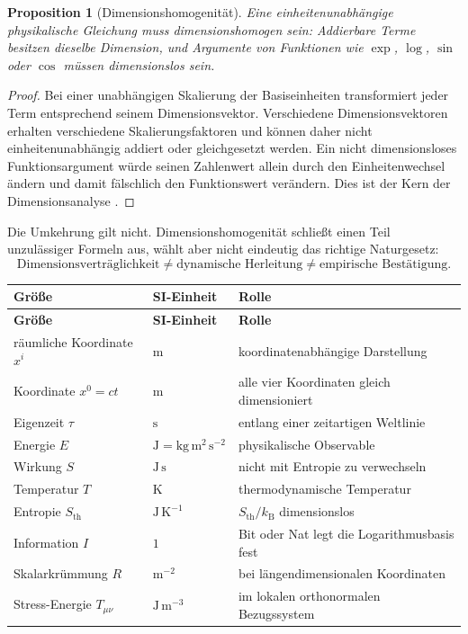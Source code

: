 \documentclass[11pt,a4paper]{article}
\newtheorem{proposition}{Proposition}[section]
\theoremstyle{remark}
\begin{document}
\begin{proposition}[Dimensionshomogenität]
Eine einheitenunabhängige physikalische Gleichung muss dimensionshomogen
sein: Addierbare Terme besitzen dieselbe Dimension, und Argumente von
Funktionen wie \(\exp\), \(\log\), \(\sin\) oder \(\cos\) müssen
dimensionslos sein.
\end{proposition}

\begin{proof}
Bei einer unabhängigen Skalierung der Basiseinheiten transformiert jeder Term
entsprechend seinem Dimensionsvektor. Verschiedene Dimensionsvektoren erhalten
verschiedene Skalierungsfaktoren und können daher nicht einheitenunabhängig
addiert oder gleichgesetzt werden. Ein nicht dimensionsloses
Funktionsargument würde seinen Zahlenwert allein durch den Einheitenwechsel
ändern und damit fälschlich den Funktionswert verändern. Dies ist der Kern der
Dimensionsanalyse \citep{buckingham1914}.
\end{proof}

Die Umkehrung gilt nicht. Dimensionshomogenität schließt einen Teil
unzulässiger Formeln aus, wählt aber nicht eindeutig das richtige Naturgesetz:
\[
  \boxed{
  \text{Dimensionsverträglichkeit}
  \neq\text{dynamische Herleitung}
  \neq\text{empirische Bestätigung}.}
\]

\begin{longtable}{>{\raggedright\arraybackslash}p{}
                  >{\raggedright\arraybackslash}p{}
                  >{\raggedright\arraybackslash}p{}}
\toprule
\textbf{Größe} & \textbf{SI-Einheit} & \textbf{Rolle} \\
\midrule
\endfirsthead
\toprule
\textbf{Größe} & \textbf{SI-Einheit} & \textbf{Rolle} \\
\midrule
\endhead
räumliche Koordinate \(x^i\) & \(\mathrm m\) & koordinatenabhängige Darstellung \\
Koordinate \(x^0=ct\) & \(\mathrm m\) & alle vier Koordinaten gleich dimensioniert \\
Eigenzeit \(\tau\) & \(\mathrm s\) & entlang einer zeitartigen Weltlinie \\
Energie \(E\) & \(\mathrm J=\mathrm{kg\,m^2\,s^{-2}}\) & physikalische Observable \\
Wirkung \(S\) & \(\mathrm{J\,s}\) & nicht mit Entropie zu verwechseln \\
Temperatur \(T\) & \(\mathrm K\) & thermodynamische Temperatur \\
Entropie \(S_{\mathrm{th}}\) & \(\mathrm{J\,K^{-1}}\) & \(S_{\mathrm{th}}/k_{\mathrm B}\) dimensionslos \\
Information \(I\) & \(1\) & Bit oder Nat legt die Logarithmusbasis fest \\
Skalarkrümmung \(R\) & \(\mathrm{m^{-2}}\) & bei längendimensionalen Koordinaten \\
Stress-Energie \(T_{\mu\nu}\) & \(\mathrm{J\,m^{-3}}\) & im lokalen orthonormalen Bezugssystem \\
\bottomrule
\end{longtable}
\end{document}
